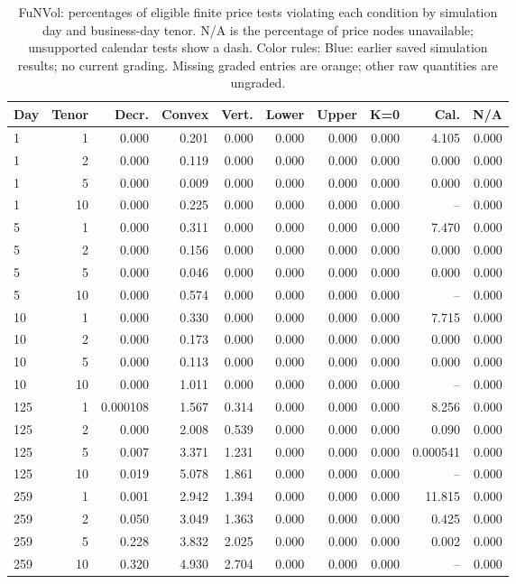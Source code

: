 \documentclass[11pt]{article}
\begin{document}
\begin{table}[H]\centering\small\setlength{\tabcolsep}{4pt}
\caption{FuNVol: percentages of eligible finite price tests violating each condition by simulation day and business-day tenor. N/A is the percentage of price nodes unavailable; unsupported calendar tests show a dash. Color rules: Blue: earlier saved simulation results; no current grading. Missing graded entries are orange; other raw quantities are ungraded.}\label{tab:literature-static-funvol}
\begin{tabular}{@{}lrrrrrrrrr@{}}
\toprule
Day & Tenor & Decr. & Convex & Vert. & Lower & Upper & K=0 & Cal. & N/A \\
\midrule
1 & 1 & 0.000 & 0.201 & 0.000 & 0.000 & 0.000 & 0.000 & 4.105 & 0.000 \\
1 & 2 & 0.000 & 0.119 & 0.000 & 0.000 & 0.000 & 0.000 & 0.000 & 0.000 \\
1 & 5 & 0.000 & 0.009 & 0.000 & 0.000 & 0.000 & 0.000 & 0.000 & 0.000 \\
1 & 10 & 0.000 & 0.225 & 0.000 & 0.000 & 0.000 & 0.000 & -- & 0.000 \\
5 & 1 & 0.000 & 0.311 & 0.000 & 0.000 & 0.000 & 0.000 & 7.470 & 0.000 \\
5 & 2 & 0.000 & 0.156 & 0.000 & 0.000 & 0.000 & 0.000 & 0.000 & 0.000 \\
5 & 5 & 0.000 & 0.046 & 0.000 & 0.000 & 0.000 & 0.000 & 0.000 & 0.000 \\
5 & 10 & 0.000 & 0.574 & 0.000 & 0.000 & 0.000 & 0.000 & -- & 0.000 \\
10 & 1 & 0.000 & 0.330 & 0.000 & 0.000 & 0.000 & 0.000 & 7.715 & 0.000 \\
10 & 2 & 0.000 & 0.173 & 0.000 & 0.000 & 0.000 & 0.000 & 0.000 & 0.000 \\
10 & 5 & 0.000 & 0.113 & 0.000 & 0.000 & 0.000 & 0.000 & 0.000 & 0.000 \\
10 & 10 & 0.000 & 1.011 & 0.000 & 0.000 & 0.000 & 0.000 & -- & 0.000 \\
125 & 1 & 0.000108 & 1.567 & 0.314 & 0.000 & 0.000 & 0.000 & 8.256 & 0.000 \\
125 & 2 & 0.000 & 2.008 & 0.539 & 0.000 & 0.000 & 0.000 & 0.090 & 0.000 \\
125 & 5 & 0.007 & 3.371 & 1.231 & 0.000 & 0.000 & 0.000 & 0.000541 & 0.000 \\
125 & 10 & 0.019 & 5.078 & 1.861 & 0.000 & 0.000 & 0.000 & -- & 0.000 \\
259 & 1 & 0.001 & 2.942 & 1.394 & 0.000 & 0.000 & 0.000 & 11.815 & 0.000 \\
259 & 2 & 0.050 & 3.049 & 1.363 & 0.000 & 0.000 & 0.000 & 0.425 & 0.000 \\
259 & 5 & 0.228 & 3.832 & 2.025 & 0.000 & 0.000 & 0.000 & 0.002 & 0.000 \\
259 & 10 & 0.320 & 4.930 & 2.704 & 0.000 & 0.000 & 0.000 & -- & 0.000 \\
\bottomrule\end{tabular}\end{table}
\end{document}
